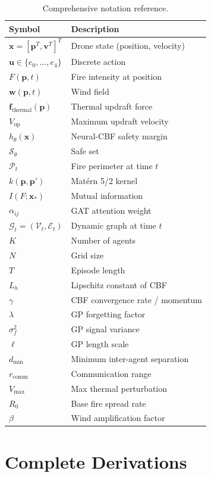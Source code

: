 \documentclass[12pt,a4paper]{article}
\DeclareRobustCommand{\cE}{\mathcal{E}}
\DeclareRobustCommand{\cG}{\mathcal{G}}
\DeclareRobustCommand{\cP}{\mathcal{P}}
\DeclareRobustCommand{\cS}{\mathcal{S}}
\DeclareRobustCommand{\cV}{\mathcal{V}}
\DeclareRobustCommand{\vect}[1]{\bm{#1}}
\begin{document}
\begin{table}[t]
\centering
\caption{Comprehensive notation reference.}
\label{tab:notation}
\small
\begin{tabular}{ll}
\toprule
\textbf{Symbol} & \textbf{Description} \\
\midrule
$\vect{x} = [\vect{p}^T, \vect{v}^T]^T$ & Drone state (position, velocity) \\
$\vect{u} \in \{e_0, \ldots, e_4\}$ & Discrete action \\
$F(\vect{p}, t)$ & Fire intensity at position \\
$\vect{w}(\vect{p}, t)$ & Wind field \\
$\vect{f}_{\text{thermal}}(\vect{p})$ & Thermal updraft force \\
$V_{\text{up}}$ & Maximum updraft velocity \\
$h_\theta(\vect{x})$ & Neural-CBF safety margin \\
$\cS_\theta$ & Safe set \\
$\cP_t$ & Fire perimeter at time $t$ \\
$k(\vect{p}, \vect{p}')$ & Mat\'ern 5/2 kernel \\
$I(F; \vect{x}_*)$ & Mutual information \\
$\alpha_{ij}$ & GAT attention weight \\
$\cG_t = (\cV_t, \cE_t)$ & Dynamic graph at time $t$ \\
$K$ & Number of agents \\
$N$ & Grid size \\
$T$ & Episode length \\
$L_h$ & Lipschitz constant of CBF \\
$\gamma$ & CBF convergence rate / momentum \\
$\lambda$ & GP forgetting factor \\
$\sigma_f^2$ & GP signal variance \\
$\ell$ & GP length scale \\
$d_{\min}$ & Minimum inter-agent separation \\
$r_{\text{comm}}$ & Communication range \\
$V_{\max}$ & Max thermal perturbation \\
$R_0$ & Base fire spread rate \\
$\beta$ & Wind amplification factor \\
\bottomrule
\end{tabular}
\end{table}

\section{Complete Derivations}
\label{app:derivations}
\end{document}
